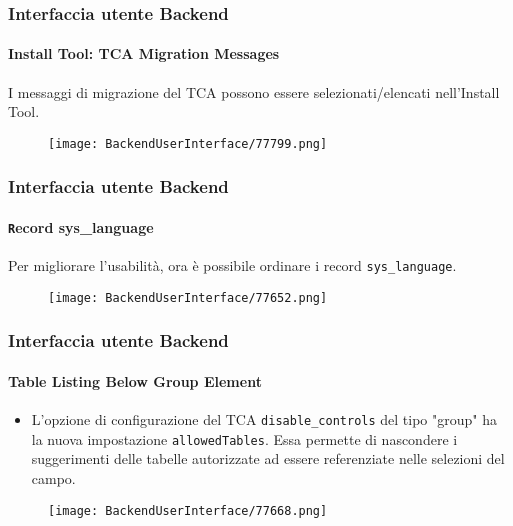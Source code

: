 \begin{frame}[fragile]
	\frametitle{Interfaccia utente Backend}
	\framesubtitle{Install Tool: TCA Migration Messages}

	I messaggi di migrazione del TCA possono essere selezionati/elencati nell'Install Tool.

	\begin{figure}
		\texttt{[image: BackendUserInterface/77799.png]}
	\end{figure}

\end{frame}


\begin{frame}[fragile]
	\frametitle{Interfaccia utente Backend}
	\framesubtitle{\texttt Record {sys\_language}}

	Per migliorare l'usabilità, ora è possibile ordinare i record \texttt{sys\_language}.

	\begin{figure}
		\texttt{[image: BackendUserInterface/77652.png]}
	\end{figure}

\end{frame}


\begin{frame}[fragile]
	\frametitle{Interfaccia utente Backend}
	\framesubtitle{Table Listing Below Group Element}

	\begin{itemize}

		\item L'opzione di configurazione del TCA \texttt{disable\_controls} del tipo "group"
			ha la nuova impostazione \texttt{allowedTables}. Essa permette di nascondere i suggerimenti delle
			tabelle autorizzate ad essere referenziate nelle selezioni del campo.

	\end{itemize}

	\begin{figure}
		\texttt{[image: BackendUserInterface/77668.png]}
	\end{figure}

\end{frame}

